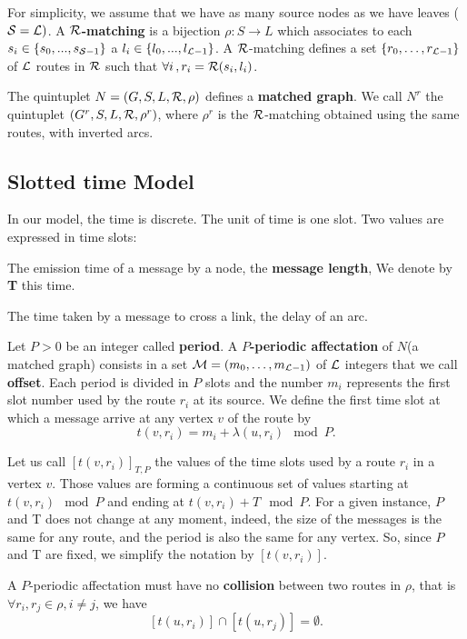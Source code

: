 \documentclass[a4paper,10pt]{article}
\newcommand\rmatching{${\cal R}$-matching\xspace}
\newcommand\matchedgraph{{\bf matched graph}}
\begin{document}
      For simplicity, we assume that we have as many source nodes as we have leaves (${\cal S} = {\cal L})$.
      A {\bf ${\cal R}$-matching} is a bijection $\rho:S\rightarrow L$ which associates to each $s_i \in \{s_0,...,s_{{\cal S}-1}\}$ 
      a $l_i \in \{l_0,...,l_{{\cal L}-1}\}$.
      A \rmatching defines a set $\{r_0, \ldots ,r_{{\cal L}-1}\}$ of ${\cal L}$ routes in ${\cal R}$ such that $\forall i\,, r_i = {\cal R}(s_i,l_i)$.

      The quintuplet $N=(G,S,L,{\cal R},\rho)$ defines a \matchedgraph. We call $N^r$ the quintuplet $(G^r,S,L,{\cal R},\rho^r)$, 
      where $\rho^r$ is the \rmatching obtained using the same routes, with inverted arcs.

    
      \subsection{Slotted time Model}
      \label{slottedtime}
      In our model, the time is discrete. The unit of time is one slot. Two values are expressed in time slots: 
      \enumerate
      \item The emission time of a message by a node, the {\bf message length}, We denote by {\bf T} this time.
      \item The time taken by a message to cross a link, the delay of an arc.


      Let $P>0$ be an integer called {\bf period}. 
      A {\bf $P$-periodic affectation} of $N$(a matched graph) consists in a set  ${\cal M}=(m_0, \ldots ,m_{{\cal L}-1})$
      of ${\cal L}$ integers that we call {\bf offset}. 
      Each period is divided in $P$ slots and the number $m_i$ represents the first slot number used by the route $r_i$ at its source.
      We define the first time slot at which a message arrive at any vertex $v$ of the route by $$t(v,r_i) = m_i+\lambda(u,r_i) \mod P.$$

      Let us call $[t(v,r_i)]_{T,P}$ the values of the time slots used by a route $r_i$ in a vertex $v$. 
      Those values are forming a continuous set of values starting at $t(v,r_i) \mod P$ and ending at $t(v,r_i) + T \mod P$.
      For a given instance, $P$ and T does not change at any moment, indeed, the size of the messages is the same for any route, and the period is also the same for any vertex.
      So, since $P$ and T are fixed, we simplify the notation by $[t(v,r_i)]$.

      A $P$-periodic affectation must have no {\bf collision} between two routes in $\rho$, that is $\forall r_i, r_j \in \rho, i \ne j$,
      we have $$[t(u,r_i)] \cap [t(u,r_j)] = \emptyset .$$
\end{document}
